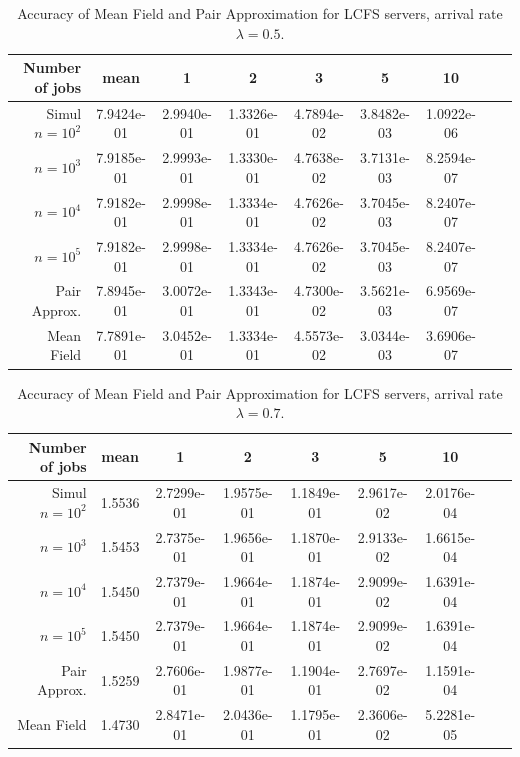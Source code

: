 \documentclass[acmsmall,nonacm]{acmart}
\begin{document}
\begin{table}[ht]
    \centering
    \begin{tabular}{|r|c|c|c|c|c|c|c|c|}
    \hline 
        Number of jobs & mean & 1 & 2 & 3 & 5 & 10\\ \hline
         \hline
 Simul $n=10^2$&  7.9424e-01&   2.9940e-01 &  1.3326e-01&   4.7894e-02&   3.8482e-03&   1.0922e-06\\
    $n=10^3$&7.9185e-01&   2.9993e-01 &  1.3330e-01&   4.7638e-02&   3.7131e-03&   8.2594e-07\\
    $n=10^4$&7.9182e-01&   2.9998e-01 &  1.3334e-01&   4.7626e-02&   3.7045e-03&   8.2407e-07\\
   $n=10^5$& 7.9182e-01&   2.9998e-01 &  1.3334e-01&   4.7626e-02&   3.7045e-03&   8.2407e-07\\\hline
  Pair Approx. & 7.8945e-01&   3.0072e-01 &  1.3343e-01&   4.7300e-02&   3.5621e-03&   6.9569e-07\\\hline
  Mean Field & 7.7891e-01&   3.0452e-01 &  1.3334e-01&   4.5573e-02&   3.0344e-03&   3.6906e-07\\
 \hline
    \end{tabular}
    \caption{Accuracy of Mean Field and Pair Approximation for LCFS servers, arrival rate $\lambda=0.5$. }
    \label{tab:simulPAIR05LCFS}
\end{table}

\begin{table}[ht]
    \centering
    \begin{tabular}{|r|c|c|c|c|c|c|c|c|}
    \hline
          Number of jobs & mean & 1 & 2 & 3 & 5 & 10\\ \hline
         \hline
Simul $n=10^2$&   1.5536&   2.7299e-01&   1.9575e-01 &  1.1849e-01 &  2.9617e-02  & 2.0176e-04\\
  $n=10^3$& 1.5453&   2.7375e-01&   1.9656e-01 &  1.1870e-01 &  2.9133e-02  & 1.6615e-04\\
  $n=10^4$& 1.5450&   2.7379e-01&   1.9664e-01 &  1.1874e-01 &  2.9099e-02  & 1.6391e-04\\
  $n=10^5$& 1.5450&   2.7379e-01&   1.9664e-01 &  1.1874e-01 &  2.9099e-02  & 1.6391e-04\\\hline
  Pair Approx. & 1.5259&   2.7606e-01&   1.9877e-01 &  1.1904e-01 &  2.7697e-02  & 1.1591e-04\\\hline
  Mean Field &  1.4730&   2.8471e-01&   2.0436e-01 &  1.1795e-01 &  2.3606e-02  & 5.2281e-05\\
    \hline 
    \end{tabular}
    \caption{Accuracy of Mean Field and Pair Approximation for LCFS servers, arrival rate $\lambda=0.7$. }
    \label{tab:simulPAIR07LCFS}
\end{table}
\end{document}
